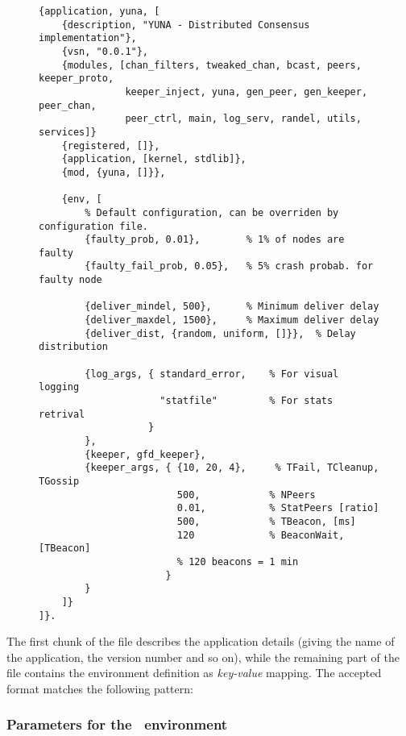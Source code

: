 \begin{figure}[hbt]
\begin{lstlisting}[label={code:ConfFile},
                   caption={default configuration file}]
{application, yuna, [
    {description, "YUNA - Distributed Consensus implementation"},
    {vsn, "0.0.1"},
    {modules, [chan_filters, tweaked_chan, bcast, peers, keeper_proto,
               keeper_inject, yuna, gen_peer, gen_keeper, peer_chan,
               peer_ctrl, main, log_serv, randel, utils, services]}
    {registered, []},
    {application, [kernel, stdlib]},
    {mod, {yuna, []}},

    {env, [
        % Default configuration, can be overriden by configuration file.
        {faulty_prob, 0.01},        % 1% of nodes are faulty
        {faulty_fail_prob, 0.05},   % 5% crash probab. for faulty node

        {deliver_mindel, 500},      % Minimum deliver delay
        {deliver_maxdel, 1500},     % Maximum deliver delay
        {deliver_dist, {random, uniform, []}},  % Delay distribution

        {log_args, { standard_error,    % For visual logging
                     "statfile"         % For stats retrival
                   }
        },
        {keeper, gfd_keeper},
        {keeper_args, { {10, 20, 4},     % TFail, TCleanup, TGossip
                        500,            % NPeers
                        0.01,           % StatPeers [ratio]
                        500,            % TBeacon, [ms]
                        120             % BeaconWait, [TBeacon]
                        % 120 beacons = 1 min
                      }
        }
    ]}
]}.
\end{lstlisting}
\end{figure}

The first chunk of the file describes the application details (giving
the name of the application, the version number and so on), while the
remaining part of the file contains the environment definition as
\emph{key-value} mapping. The accepted format matches the following
pattern:

\begin{quote}
\centering
{}
\end{quote}

\subsubsection{Parameters for the \YUNA\ environment}
\label{subsub:ConfEnvParams}

